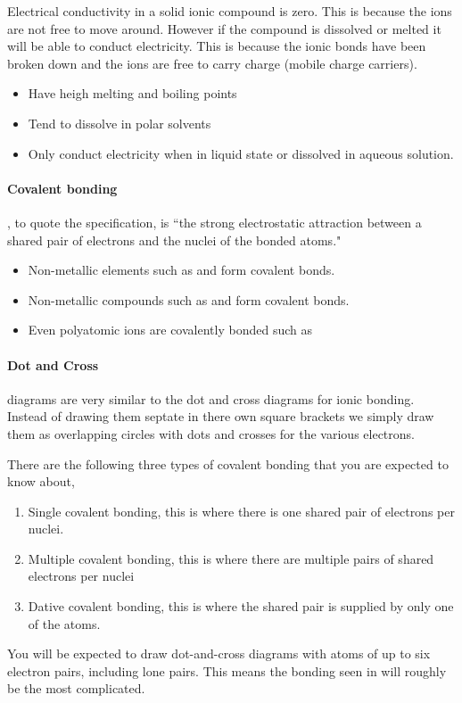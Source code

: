 \documentclass[11pt,a4paper]{memoir}
\begin{document}
	Electrical conductivity in a solid ionic compound is zero. This is because the ions are not free to move around. However if the compound is dissolved or melted it will be able to conduct electricity. This is because the ionic bonds have been broken down and the ions are free to carry charge (mobile charge carriers).
	 
	\begin{itemize}
		\item Have heigh melting and boiling points
		\item Tend to dissolve in polar solvents
		\item Only conduct electricity when in liquid state or dissolved in aqueous solution.
	\end{itemize}
	 
	\paragraph{Covalent bonding} , to quote the specification, is ``the strong electrostatic attraction between a shared pair of electrons and the nuclei of the bonded atoms."
	\begin{itemize}
	 	\item Non-metallic elements such as  and  form covalent bonds.
	 	\item Non-metallic compounds such as  and  form covalent bonds.
	 	\item Even polyatomic ions are covalently bonded such as 
	\end{itemize}
	
	\paragraph{Dot and Cross} diagrams are very similar to the dot and cross diagrams for ionic bonding. Instead of drawing them septate in there own square brackets we simply draw them as overlapping circles with dots and crosses for the various electrons.
	
	There are the following three types of covalent bonding that you are expected to know about,
	\begin{enumerate}
		\item Single covalent bonding, this is where there is one shared pair of electrons per nuclei.
		\item Multiple covalent bonding, this is where there are multiple pairs of shared electrons per nuclei
		\item Dative covalent bonding, this is where the shared pair is supplied by only one of the atoms.
	\end{enumerate}
	You will be expected to draw dot-and-cross diagrams with atoms of up to six electron pairs, including lone pairs. This means the bonding seen in  will roughly be the most complicated.
	
\end{document}
